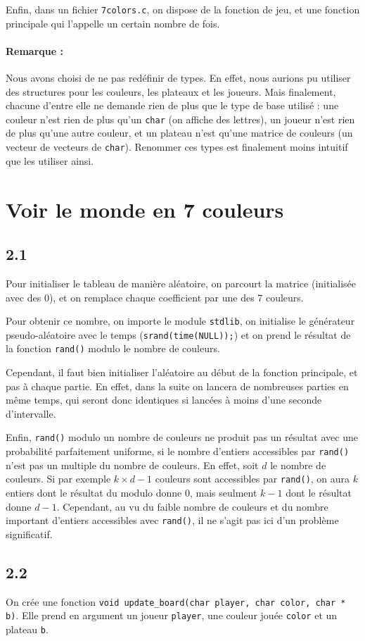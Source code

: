 \documentclass[12pt]{article}
\def\question#1{\subsection*{#1}}
\def\sec#1{\section{#1}}
\begin{document}
Enfin, dans un fichier \texttt{7colors.c}, on dispose de la fonction de jeu, et une fonction principale qui l'appelle un certain nombre de fois.

\paragraph{Remarque :} Nous avons choisi de ne pas redéfinir de types. En effet, nous aurions pu utiliser des structures pour les couleurs, les plateaux et les joueurs. Mais finalement, chacune d'entre elle ne demande rien de plus que le type de base utilisé : une couleur n'est rien de plus qu'un \texttt{char} (on affiche des lettres), un joueur n'est rien de plus qu'une autre couleur, et un plateau n'est qu'une matrice de couleurs (un vecteur de vecteurs de \texttt{char}). Renommer ces types est finalement moins intuitif que les utiliser ainsi.



\sec{Voir le monde en 7 couleurs}
\question{2.1}
Pour initialiser le tableau de manière aléatoire, on parcourt la matrice (initialisée avec des 0), et on remplace chaque coefficient par une des 7 couleurs.

Pour obtenir ce nombre, on importe le module \texttt{stdlib}, on initialise le générateur pseudo-aléatoire avec le temps (\texttt{srand(time(NULL));}) et on prend le résultat de la fonction \texttt{rand()} modulo le nombre de couleurs.

Cependant, il faut bien initialiser l'aléatoire au début de la fonction principale, et pas à chaque partie. En effet, dans la suite on lancera de nombreuses parties en même temps, qui seront donc identiques si lancées à moins d'une seconde d'intervalle.

Enfin, \texttt{rand()} modulo un nombre de couleurs ne produit pas un résultat avec une probabilité parfaitement uniforme, si le nombre d'entiers accessibles par \texttt{rand()} n'est pas un multiple du nombre de couleurs. En effet, soit $d$ le nombre de couleurs. Si par exemple $k\times d - 1$ couleurs sont accessibles par \texttt{rand()}, on aura $k$ entiers dont le résultat du modulo donne 0, mais seulment $k-1$ dont le résultat donne $d-1$.
Cependant, au vu du faible nombre de couleurs et du nombre important d'entiers accessibles avec \texttt{rand()}, il ne s'agit pas ici d'un problème significatif.

\question{2.2}
On crée une fonction \texttt{void update\_board(char player, char color, char * b)}. Elle prend en argument un joueur \texttt{player}, une couleur jouée \texttt{color} et un plateau \texttt{b}.
\end{document}
